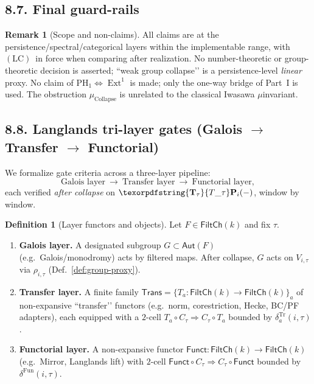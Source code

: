 \documentclass[11pt]{article}
\numberwithin{equation}{section}
\theoremstyle{plain}
\theoremstyle{definition}
\theoremstyle{remark}
\DeclareMathOperator{\Ext}{Ext}
\DeclareRobustCommand{\hyp}{\nobreakdash-}
\theoremstyle{plain}
\theoremstyle{definition}
\numberwithin{equation}{section}
\theoremstyle{definition}
\newtheorem{definition}[theorem]{Definition}
\newtheorem{remark}[theorem]{Remark}
\DeclareRobustCommand{\FiltCh}[1]{\mathsf{FiltCh}(#1)}
\DeclareRobustCommand{\Ttau}{\texorpdfstring{\ensuremath{\mathbf{T}_{\tau}}}{T\_\tau}}
\DeclareRobustCommand{\LC}{\texorpdfstring{\ensuremath{\mathrm{(LC)}}}{(LC)}}
\numberwithin{equation}{section}
\theoremstyle{plain}
\theoremstyle{definition}
\theoremstyle{remark}
\newcommand{\Trans}{\mathsf{Trans}}
\newcommand{\Funct}{\mathsf{Funct}}
\providecommand{\Tfun}[1]{\mathbf{T}_{#1}}
\providecommand{\Ttau}{\Tfun{\tau}}
\begin{document}
\subsection*{8.7. Final guard\hyp rails}
\begin{remark}[Scope and non\hyp claims]\label{rk:8-guard}
All claims are at the persistence/spectral/categorical layers within the implementable range, with \LC\ in force when comparing after realization.
No number\hyp theoretic or group\hyp theoretic decision is asserted; “weak group collapse’’ is a persistence\hyp level \emph{linear} proxy.
No claim of \(\mathrm{PH}_1\Leftrightarrow\Ext^1\) is made; only the one\hyp way bridge of Part~I is used.
The obstruction \(\mu_{\mathrm{Collapse}}\) is unrelated to the classical Iwasawa \(\mu\)\nobreakdash invariant.
\end{remark}


\subsection*{8.8. Langlands tri-layer gates (Galois $\to$ Transfer $\to$ Functorial)}
We formalize gate criteria across a three\hyp layer pipeline:
\[
\text{Galois layer}\ \longrightarrow\ \text{Transfer layer}\ \longrightarrow\ \text{Functorial layer},
\]
each verified \emph{after collapse} on \(\Ttau\mathbf{P}_i(-)\), window by window.

\begin{definition}[Layer functors and objects]\label{def:layers}
Let \(F\in\FiltCh{k}\) and fix \(\tau\).
\begin{enumerate}
  \item \textbf{Galois layer.} A designated subgroup \(G\subset \mathsf{Aut}(F)\) (e.g.\ Galois/monodromy) acts by filtered maps. After collapse, \(G\) acts on \(V_{i,\tau}\) via \(\rho_{i,\tau}\) (Def.~\ref{def:group-proxy}).
  \item \textbf{Transfer layer.} A finite family \(\Trans=\{T_a:\FiltCh{k}\to\FiltCh{k}\}_a\) of non\hyp expansive “transfer’’ functors (e.g.\ norm, corestriction, Hecke, BC/PF adapters), each equipped with a \(2\)\hyp cell \(T_a\circ C_\tau\Rightarrow C_\tau\circ T_a\) bounded by \(\delta^{\mathrm{Tr}}_a(i,\tau)\).
  \item \textbf{Functorial layer.} A non\hyp expansive functor \(\Funct:\FiltCh{k}\to\FiltCh{k}\) (e.g.\ Mirror, Langlands lift) with \(2\)\hyp cell \(\Funct\circ C_\tau\Rightarrow C_\tau\circ \Funct\) bounded by \(\delta^{\mathrm{Fun}}(i,\tau)\).
\end{enumerate}
\end{definition}
\end{document}
